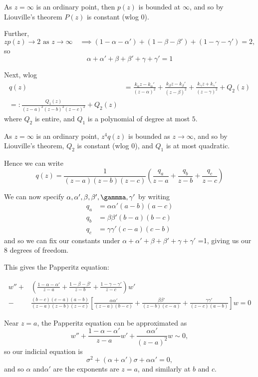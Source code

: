 \documentclass[a4paper]{article}
\begin{document}
As $z=\infty$ is an ordinary point, then $p(z)$ is bounded at $\infty$, and so by Liouville's theorem $P(z)$ is constant (wlog 0).

Further,
\[
	zp(z) \to 2 \text{ as } z\to \infty \quad \implies (1-\alpha - \alpha') + (1-\beta - \beta') + (1-\gamma - \gamma') = 2
,\]
so
\[
\alpha + \alpha' + \beta + \beta' + \gamma + \gamma' =1
\]

Next, wlog
\begin{align*}
	q(z) &= \frac{k_{\alpha} z - k_{\alpha}'}{(z-\alpha)^2} + \frac{k_{\beta} z - k_{\beta}'}{(z-\beta)^2} + \frac{k_{\gamma}z + k_{\gamma}'}{(z-\gamma)^2} + Q_2(z) \\
	=: \frac{Q_1(z)}{(z-a)^2(z-b)^2(z-c)^2} + Q_2(z)
\end{align*}
	where $Q_2$ is entire, and $Q_1$ is a polynomial of degree at most $5$.

	As  $z=\infty$ is an ordinary point, $z^{4}q(z)$ is bounded as $z\to \infty$, and so by Liouville's theorem,  $Q_2$ is constant (wlog 0), and $Q_1$ is at most quadratic.

	Hence we can write
	\[
		q(z) = \frac{1}{(z-a)(z-b)(z-c)}\left( \frac{q_a}{z-a} + \frac{q_b}{z-b} + \frac{q_c}{z-c} \right) 
	\] 

	We can now specify $\alpha, \alpha', \beta, \beta', \gammma, \gamma'$ by writing
	\begin{align*}
		q_a &= \alpha\alpha' (a-b)(a-c) \\
		q_b &= \beta \beta' (b-a)(b-c)\\
		q_c &= \gamma \gamma' (c-a)(c-b)
	\end{align*}
	and so we can fix our constants under  $\alpha + \alpha' + \beta + \beta' + \gamma + \gamma'$ =1, giving us our 8 degrees of freedom.

	This gives the Papperitz equation:

	\begin{align*}
		w'' + &\left( \frac{1-\alpha - \alpha'}{z-a} + \frac{1-\beta - \beta'}{z-b} + \frac{1- \gamma - \gamma'}{z-c} \right) w' \\ - &\frac{(b-c)(c-a)(a-b)}{(z-a)(z-b)(z-c)} \left[ \frac{\alpha\alpha'}{(z-a)(b-c)} + \frac{\beta\beta'}{(z-b)(c-a)} + \frac{\gamma\gamma'}{(z-c)(a-b)} \right] w = 0
	\end{align*}

	Near $z=a$, the Papperitz equation can be approximated as
	\[
		w'' + \frac{1-\alpha - \alpha'}{z-a}w' + \frac{\alpha\alpha'}{(z-a)^2}w \sim 0
	,\] so our indicial equation is
	\[
		\sigma^2 + (\alpha + \alpha')\sigma + \alpha\alpha' = 0
	,\] and so $\alpha $ and$ \alpha'$ are the exponents are $z=a$, and similarly at $b$ and $c$. 
\end{document}
